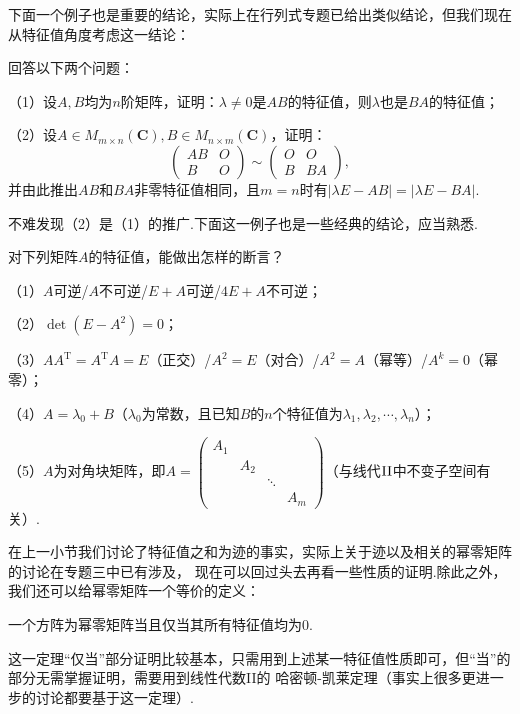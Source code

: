 下面一个例子也是重要的结论，实际上在行列式专题已给出类似结论，但我们现在从特征值角度考虑这一结论：
\begin{example}
	回答以下两个问题：
	
	\textup{（1）}设$A,B$均为$n$阶矩阵，证明：$\lambda\neq 0$是$AB$的特征值，则$\lambda$也是$BA$的特征值\textup{；}
	
	\textup{（2）}设$A\in M_{m\times n}(\mathbf{C}),B\in M_{n\times m}(\mathbf{C})$，证明：
	$$\begin{pmatrix}
		AB & O \\ B & O
	\end{pmatrix}\sim\begin{pmatrix}
		O & O \\ B & BA
	\end{pmatrix},$$
	并由此推出$AB$和$BA$非零特征值相同，且$m=n$时有$|\lambda E-AB|=|\lambda E-BA|$.
\end{example}
不难发现（2）是（1）的推广.下面这一例子也是一些经典的结论，应当熟悉.
\begin{example}
	对下列矩阵$A$的特征值，能做出怎样的断言？
	
	\textup{（1）}$A$可逆/$A$不可逆/$E+A$可逆/$4E+A$不可逆\textup{；}
	
	\textup{（2）}$\det(E-A^2)=0$\textup{；}
	
	\textup{（3）}$AA^\mathrm{T}=A^\mathrm{T}A=E$（正交）/$A^2=E$（对合）/$A^2=A$（幂等）/$A^k=0$（幂零）\textup{；}
	
	\textup{（4）}$A=\lambda_0+B$（$\lambda_0$为常数，且已知$B$的$n$个特征值为$\lambda_1,\lambda_2,\cdots,\lambda_n$）\textup{；}
	
	\textup{（5）}$A$为对角块矩阵，即$A=\begin{pmatrix}
		A_1 &  &  &  \\  & A_2 &  &  \\  &  & \ddots &  \\  &  &  & A_m
	\end{pmatrix}$（与线代$\textup{II}$中不变子空间有关）.
\end{example}
在上一小节我们讨论了特征值之和为迹的事实，实际上关于迹以及相关的幂零矩阵的讨论在专题三中已有涉及，
现在可以回过头去再看一些性质的证明.除此之外，我们还可以给幂零矩阵一个等价的定义：
\begin{theorem}
	一个方阵为幂零矩阵当且仅当其所有特征值均为$0$.
\end{theorem}
这一定理“仅当”部分证明比较基本，只需用到上述某一特征值性质即可，但“当”的部分无需掌握证明，需要用到线性代数II的
哈密顿-凯莱定理（事实上很多更进一步的讨论都要基于这一定理）.
